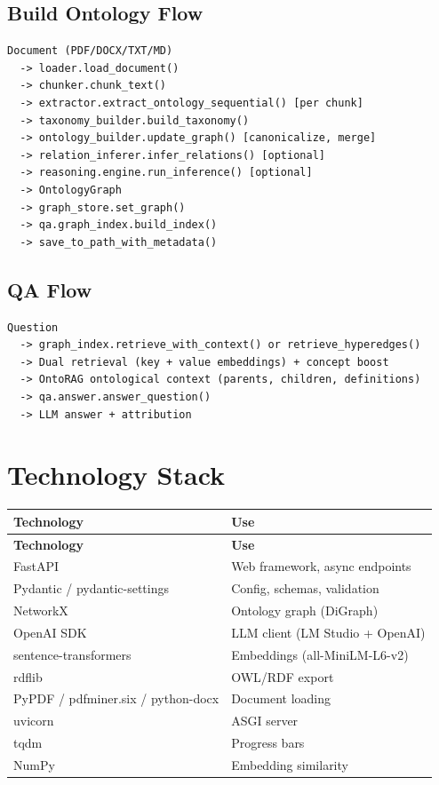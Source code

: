 \documentclass[11pt,a4paper]{article}
\begin{document}
\subsection{Build Ontology Flow}

\begin{verbatim}
Document (PDF/DOCX/TXT/MD)
  -> loader.load_document()
  -> chunker.chunk_text()
  -> extractor.extract_ontology_sequential() [per chunk]
  -> taxonomy_builder.build_taxonomy()
  -> ontology_builder.update_graph() [canonicalize, merge]
  -> relation_inferer.infer_relations() [optional]
  -> reasoning.engine.run_inference() [optional]
  -> OntologyGraph
  -> graph_store.set_graph()
  -> qa.graph_index.build_index()
  -> save_to_path_with_metadata()
\end{verbatim}

\subsection{QA Flow}

\begin{verbatim}
Question
  -> graph_index.retrieve_with_context() or retrieve_hyperedges()
  -> Dual retrieval (key + value embeddings) + concept boost
  -> OntoRAG ontological context (parents, children, definitions)
  -> qa.answer.answer_question()
  -> LLM answer + attribution
\end{verbatim}

\section{Technology Stack}

\begin{center}
\begin{longtable}{@{}ll@{}}
\toprule
\textbf{Technology} & \textbf{Use} \\
\midrule
\endfirsthead

\midrule
\textbf{Technology} & \textbf{Use} \\
\midrule
\endhead

FastAPI & Web framework, async endpoints \\
Pydantic / pydantic-settings & Config, schemas, validation \\
NetworkX & Ontology graph (DiGraph) \\
OpenAI SDK & LLM client (LM Studio + OpenAI) \\
sentence-transformers & Embeddings (all-MiniLM-L6-v2) \\
rdflib & OWL/RDF export \\
PyPDF / pdfminer.six / python-docx & Document loading \\
uvicorn & ASGI server \\
tqdm & Progress bars \\
NumPy & Embedding similarity \\
\bottomrule
\end{longtable}
\end{center}
\end{document}
